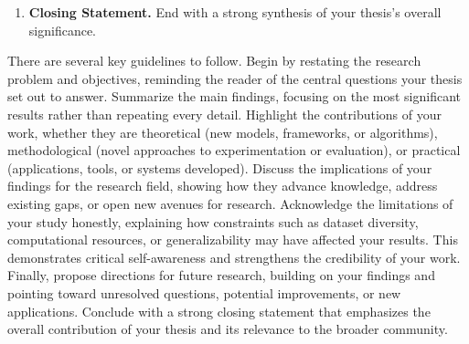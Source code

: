 \documentclass[PCOM,Thesis,Review]{mpThesis}
\newcommand{\Hd}[1]{{\color{SteelBlue}\bf#1.}}
\begin{document}
\begin{MainMatter}
\begin{Remark}
\begin{enumerate}
\item \Hd{Closing Statement}
End with a strong synthesis of your thesis's overall significance.
\end{enumerate}

There are several key guidelines to follow.
Begin by restating the research problem and objectives, reminding the reader of the central questions your thesis set out to answer.
Summarize the main findings, focusing on the most significant results rather than repeating every detail.
Highlight the contributions of your work, whether they are
theoretical (new models, frameworks, or algorithms),
methodological (novel approaches to experimentation or evaluation), or
practical (applications, tools, or systems developed).
Discuss the implications of your findings for the research field, showing how they advance knowledge, address existing gaps, or open new avenues for research.
Acknowledge the limitations of your study honestly, explaining how constraints such as dataset diversity, computational resources, or generalizability may have affected your results.
This demonstrates critical self-awareness and strengthens the credibility of your work.
Finally, propose directions for future research, building on your findings and pointing toward unresolved questions, potential improvements, or new applications.
Conclude with a strong closing statement that emphasizes the overall contribution of your thesis and its relevance to the broader community.
\end{Remark}
\end{MainMatter}
\begin{BackMatter}
\end{BackMatter}
\end{document}
